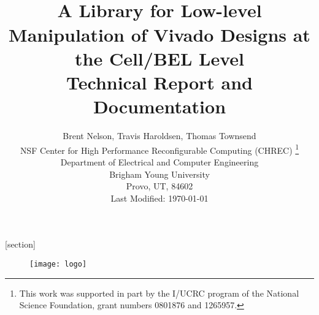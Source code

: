 \documentclass[10pt]{article}
\begin{document}
[section]

\date{}

\title{{\bf \Huge {}}\\[0.1in]
A Library for Low-level Manipulation 
of Vivado Designs at the Cell/BEL Level\\[0.3in]
Technical Report and Documentation\\[0.1in]
}
\author{\Large Brent Nelson, Travis Haroldsen, Thomas Townsend\\[0.2in] \large NSF Center for High Performance Reconfigurable Computing (CHREC)
\thanks{This work was supported in part by the I/UCRC program of the National
 Science Foundation, grant numbers 0801876 and 1265957.}\\
\large Department of Electrical and Computer Engineering  \\
\large  Brigham Young University \\
\large  Provo, UT, 84602 \\[0.7in]
\large Last Modified: \today \\[0.05in]
}


\maketitle
\begin{figure}[H]
\centering
\texttt{[image: logo]}
\end{figure}

\newpage
\tableofcontents















\end{document}
